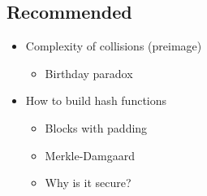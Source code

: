 
\subsection{Recommended}
\begin{itemize}
\item Complexity of collisions (preimage)
  \begin{itemize}
  \item Birthday paradox
  \end{itemize}
\item How to build hash functions
  \begin{itemize}
  \item Blocks with padding
  \item Merkle-Damgaard
  \item Why is it secure?
  \end{itemize}
\end{itemize}
